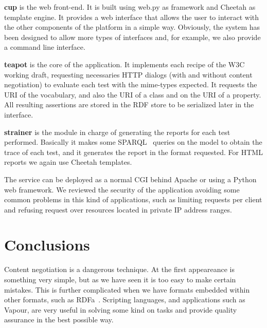 \documentclass{../templates/llncs}
\begin{document}
\begin{description}

  \item \textbf{cup} is the web front-end. It is built using web.py as framework
        and Cheetah as template engine. It provides a web interface that allows 
        the user to interact with the other components of the platform in a 
        simple way. Obviously, the system has been designed to allow more types 
        of interfaces and, for example, we also provide a command line interface.

  \item \textbf{teapot} is the core of the application. It implements each
        recipe of the W3C working draft, requesting necessaries HTTP dialogs 
        (with and without content negotiation) to evaluate each test with the 
        mime-types expected. It requests the URI of the vocabulary, and also the 
        URI of a class and on the URI of a property. All resulting assertions are 
        stored in the RDF store to be serialized later in the interface.

  \item \textbf{strainer} is the module in charge of generating the reports for
        each test performed. Basically it makes some SPARQL~\cite{SPARQL} queries
        on the model to obtain the trace of each test, and it generates the
        report in the format requested. For HTML reports we again use Cheetah 
        templates.

\end{description}

The service can be deployed as a normal CGI behind Apache or using a Python web 
framework. We reviewed the security of the application avoiding some common problems
in this kind of applications, such as limiting requests per client and refusing
request over resources located in private IP address ranges.

\section{\label{sec:conclusions}Conclusions}

Content negotiation is a dangerous technique. At the first appeareance is something very 
simple, but as we have seen it is too easy to make certain mistakes. This is 
further complicated when we have formats embedded within other formats,
such as RDFa~\cite{Birbeck2006}. Scripting languages, and applications such as 
Vapour, are very useful in solving some kind on tasks and provide quality 
assurance in the best possible way.
\end{document}
